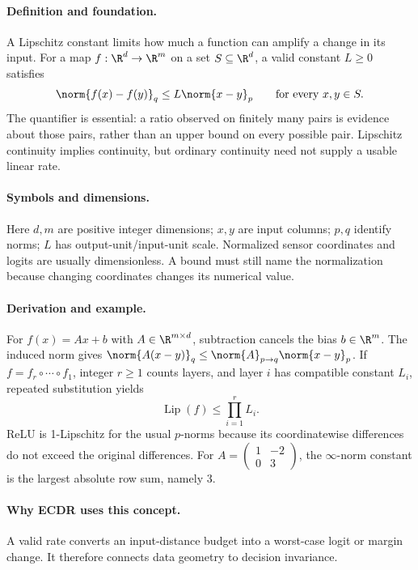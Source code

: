 \paragraph{Definition and foundation.}
A Lipschitz constant limits how much a function can amplify a change in its input. For a map $f:\R^d\to\R^m$ on a set $S\subseteq\R^d$, a valid constant $L\ge0$ satisfies
\[
 \norm{f(x)-f(y)}_q\le L\norm{x-y}_p\qquad\text{for every }x,y\in S.
\]
The quantifier is essential: a ratio observed on finitely many pairs is evidence about those pairs, rather than an upper bound on every possible pair. Lipschitz continuity implies continuity, but ordinary continuity need not supply a usable linear rate.
\paragraph{Symbols and dimensions.}
Here $d,m$ are positive integer dimensions; $x,y$ are input columns; $p,q$ identify norms; $L$ has output-unit/input-unit scale. Normalized sensor coordinates and logits are usually dimensionless. A bound must still name the normalization because changing coordinates changes its numerical value.
\paragraph{Derivation and example.}
For $f(x)=Ax+b$ with $A\in\R^{m\times d}$, subtraction cancels the bias $b\in\R^m$. The induced norm gives $\norm{A(x-y)}_q\le\norm{A}_{p\to q}\norm{x-y}_p$. If $f=f_r\circ\cdots\circ f_1$, integer $r\ge1$ counts layers, and layer $i$ has compatible constant $L_i$, repeated substitution yields
\[
 \operatorname{Lip}(f)\le\prod_{i=1}^{r}L_i.
\]
ReLU is 1-Lipschitz for the usual $p$-norms because its coordinatewise differences do not exceed the original differences. For $A=\left(\begin{smallmatrix}1&-2\\0&3\end{smallmatrix}\right)$, the $\infty$-norm constant is the largest absolute row sum, namely 3.
\paragraph{Why ECDR uses this concept.}
A valid rate converts an input-distance budget into a worst-case logit or margin change. It therefore connects data geometry to decision invariance.
